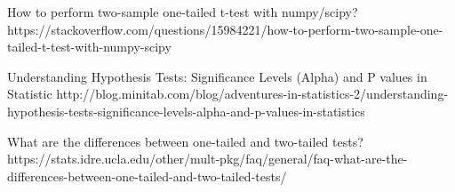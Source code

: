 \documentclass[11pt]{article}
\begin{document}
How to perform two-sample one-tailed t-test with numpy/scipy?
https://stackoverflow.com/questions/15984221/how-to-perform-two-sample-one-tailed-t-test-with-numpy-scipy

Understanding Hypothesis Tests: Significance Levels (Alpha) and P values
in Statistic
http://blog.minitab.com/blog/adventures-in-statistics-2/understanding-hypothesis-tests-significance-levels-alpha-and-p-values-in-statistics

What are the differences between one-tailed and two-tailed tests?
https://stats.idre.ucla.edu/other/mult-pkg/faq/general/faq-what-are-the-differences-between-one-tailed-and-two-tailed-tests/


    
    
    
    
\end{document}
